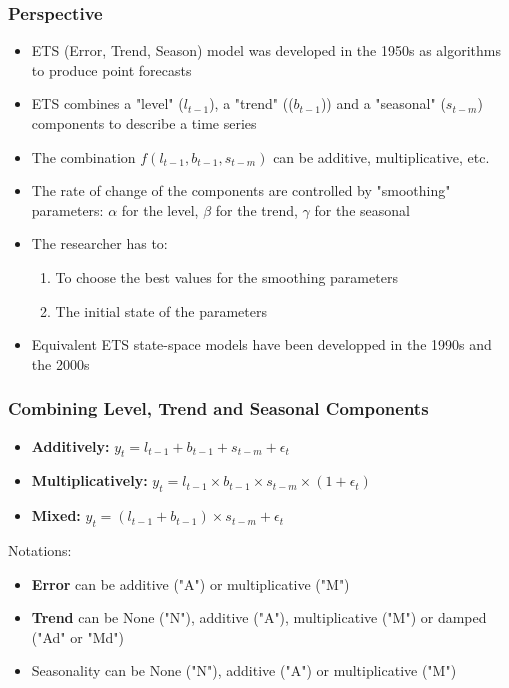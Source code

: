\documentclass{beamer}
\begin{document}
\begin{frame}
  \frametitle{Perspective}
  
  \begin{itemize}
  \item ETS (Error, Trend, Season) model was developed in the 1950s as algorithms to produce point forecasts
  \item ETS combines a "level" ($l_{t-1}$), a "trend" (($b_{t-1}$)) and a "seasonal" ($s_{t-m}$) components to describe a time series
  \item The combination $f(l_{t-1}, b_{t-1}, s_{t-m})$ can be additive, multiplicative, etc.
  \item The rate of change of the components are controlled by "smoothing" parameters: $\alpha$ for the level, $\beta$ for the trend, $\gamma$ for the seasonal
  \item The researcher has to:
    \begin{enumerate}
    \item To choose the best values for the smoothing parameters 
    \item The initial state of the parameters
    \end{enumerate}
  \item Equivalent ETS state-space models have been developped in the 1990s and the 2000s
  \end{itemize}

  
\end{frame}


\begin{frame}
  \frametitle{Combining Level, Trend and Seasonal Components}

  \begin{itemize}
  \item \textbf{Additively:} $y_t = l_{t-1} + b_{t-1} + s_{t-m} + \epsilon_t$
  \item \textbf{Multiplicatively:} $y_t = l_{t-1} \times b_{t-1} \times s_{t-m} \times (1 + \epsilon_t)$
  \item \textbf{Mixed:} $y_t = (l_{t-1} + b_{t-1}) \times s_{t-m} + \epsilon_t $  
  \end{itemize}

  Notations:
  \begin{itemize}
  \item \textbf{Error} can be additive ("A") or multiplicative ("M")
  \item \textbf{Trend} can be None ("N"), additive ("A"), multiplicative ("M") or damped ("Ad" or "Md")
  \item Seasonality can be None ("N"), additive ("A") or multiplicative ("M")
  \end{itemize}
    
\end{frame}
\end{document}
